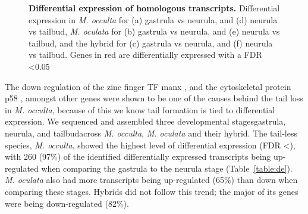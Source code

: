 \begin{figure}
{	}
	\caption{\textbf{Differential expression of homologous transcripts.} Differential expression in \textit{M. occulta} for (a) gastrula vs neurula, and (d) neurula vs tailbud, \textit{M. oculata} for (b) gastrula vs neurula, and (e) neurula vs tailbud, and the hybrid for (c) gastrula vs neurula, and (f) neurula vs tailbud. Genes in red are differentially expressed with a FDR \textless 0.05}
	\label{fig:de_plots}
\end{figure}

The down regulation of the zinc finger TF manx \cite{swalla_requirement_1996}, and the cytoskeletal protein p58 \cite{swalla_identification_1991}, amongst other genes were shown to be one of the causes behind the tail loss in \textit{M. occulta}, because of this we know tail formation is tied to differential expression. We sequenced and assembled three developmental stages\textemdash gastrula, neurula, and tailbud\textemdash across \textit{M. occulta}, \textit{M. oculata} and their hybrid. The tail-less species, \textit{M. occulta}, showed the highest level of differential expression (FDR \textless), with 260 (97\%) of the identified differentially expressed transcripts being up-regulated when comparing the gastrula to the neurula stage (Table~\ref{table:de}). \textit{M. oculata} also had more transcripts being up-regulated (65\%) than down when comparing these stages. Hybrids did not follow this trend; the major of its genes were being down-regulated (82\%).  

